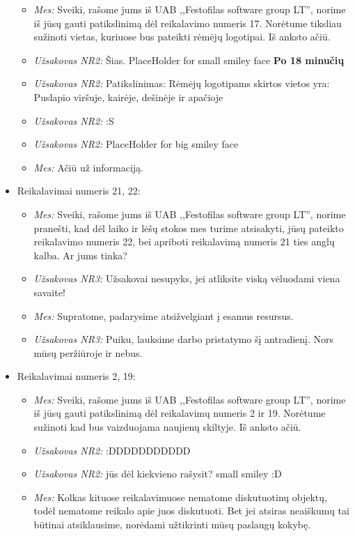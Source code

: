 \documentclass{VUMIFPSkursinis}
\begin{document}
\begin{itemize}
\begin{itemize}
					\item \textit{Mes:} Sveiki, rašome jums iš UAB ,,Festofilas software group LT'', norime iš jūsų gauti patikslinimą dėl reikalavimo numeris 17. Norėtume tiksliau sužinoti vietas, kuriuose bus pateikti rėmėjų logotipai. Iš anksto ačiū.
					\item \textit{Užsakovas NR2:} Šias. {PlaceHolder for small smiley face}
					\textbf{Po 18 minučių}
					\item \textit{Užsakovas NR2:} Patikslinimas: Rėmėjų logotipams skirtos vietos yra: Puslapio viršuje, kairėje, dešinėje ir apačioje
					\item \textit{Užsakovas NR2:} :S
					\item \textit{Užsakovas NR2:} {PlaceHolder for big smiley face}
					\item \textit{Mes:} Ačiū už informaciją.
				\end{itemize}
			\item Reikalavimai numeris 21, 22:
				\begin{itemize}
					\item \textit{Mes:} Sveiki, rašome jums iš UAB ,,Festofilas software group LT'', norime pranešti, kad dėl laiko ir lėšų stokos mes turime atsisakyti, jūsų pateikto reikalavimo numeris 22, bei apriboti reikalavimą numeris 21 ties anglų kalba. Ar jums tinka?
					\item \textit{Užsakovas NR3:} Užsakovai nesupyks, jei atliksite viską vėluodami viena savaite!
					\item \textit{Mes:} Supratome, padarysime atsižvelgiant į esamus resursus.
					\item \textit{Užsakovas NR3:} Puiku, lauksime darbo pristatymo šį antradienį. Nors mūsų peržiūroje ir nebus.
				\end{itemize}
			\item Reikalavimai numeris 2, 19:
				\begin{itemize}
					\item \textit{Mes:} Sveiki, rašome jums iš UAB ,,Festofilas software group LT'', norime iš jūsų gauti patikslinimą dėl reikalavimų numeris 2 ir 19. Norėtume sužinoti kad bus vaizduojama naujienų skiltyje. Iš anksto ačiū.
					\item \textit{Užsakovas NR2:} :DDDDDDDDDDD
					\item \textit{Užsakovas NR2:} jūs dėl kiekvieno rašysit? small smiley :D
					\item \textit{Mes:} Kolkas kituose reikalavimuose nematome diskutuotinų objektų, todėl nematome reikalo apie juos diskutuoti. Bet jei atsiras neaiškumų tai būtinai atsiklausime, norėdami užtikrinti mūsų paslaugų kokybę.

\end{itemize}
\end{itemize}
\end{document}
